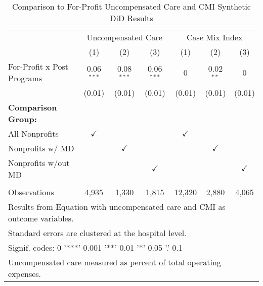 \begin{table}[ht!]

\caption{\label{tab:forprofit_uncompCMI_synth}Comparison to For-Profit Uncompensated Care and CMI Synthetic DiD Results}
\centering
\begin{tabular}[t]{lcccccc}
\toprule
\multicolumn{1}{c}{ } & \multicolumn{3}{c}{Uncompensated Care} & \multicolumn{3}{c}{Case Mix Index} \\
 & (1) & (2) & (3) & (1) & (2) & (3)\\
\midrule
For-Profit x Post Programs & 0.06$^{***}$ & 0.08$^{***}$ & 0.06$^{***}$ & 0 & 0.02$^{**}$ & 0\\
 & (0.01) & (0.01) & (0.01) & (0.01) & (0.01) & (0.01)\\
\textbf{Comparison Group:} &  &  &  &  &  & \\
All Nonprofits & $\checkmark$ &  &  & $\checkmark$ &  & \\
Nonprofits w/ MD &  & $\checkmark$ &  &  & $\checkmark$ & \\
Nonprofits w/out MD &  &  & $\checkmark$ &  &  & $\checkmark$\\
 &  &  &  &  &  & \\
Observations & 4,935 & 1,330 & 1,815 & 12,320 & 2,880 & 4,065\\
\bottomrule
\multicolumn{7}{l}{\textsuperscript{} Results from Equation with uncompensated care and CMI as outcome variables.}\\
\multicolumn{7}{l}{\textsuperscript{} Standard errors are clustered at the hospital level.}\\
\multicolumn{7}{l}{\textsuperscript{} Signif. codes: 0 '***' 0.001 '**' 0.01 '*' 0.05 '.' 0.1}\\
\multicolumn{7}{l}{\textsuperscript{} Uncompensated care measured as percent of total operating expenses.}\\
\end{tabular}
\end{table}
